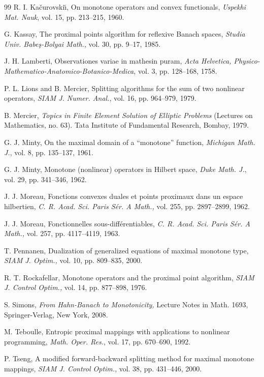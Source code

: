 \documentclass[a4paper,11pt,fleqn]{article}
\theoremstyle{plain}{\theorembodyfont{\rmfamily}%
\newtheorem{conjecture}[theorem]{Conjecture}}
\theoremstyle{plain}{\theorembodyfont{\rmfamily}%
\newtheorem{example}[theorem]{Example}}
\theoremstyle{plain}{\theorembodyfont{\rmfamily}%
\newtheorem{remark}[theorem]{Remark}}
\theoremstyle{plain}{\theorembodyfont{\rmfamily}%
\newtheorem{algorithm}[theorem]{Algorithm}}
\theoremstyle{plain}{\theorembodyfont{\rmfamily}%
\newtheorem{condition}[theorem]{Condition}}
\theoremstyle{plain}{\theorembodyfont{\rmfamily}%
\newtheorem{definition}[theorem]{Definition}}
\theoremstyle{plain}{\theorembodyfont{\rmfamily}
\newtheorem{problem}[theorem]{Problem}}
\theoremstyle{plain}{\theorembodyfont{\rmfamily}
\newtheorem{notation}[theorem]{Notation}}
\numberwithin{equation}{section}
\begin{document}
\begin{thebibliography}{99}
R. I. Ka{\v{c}}urovski{\u\i}, 
On monotone operators and convex functionals, 
{\em Uspekhi Mat. Nauk}, 
vol. 15, pp. 213--215, 1960.

G. Kassay,
The proximal points algorithm for reflexive Banach spaces,
{\em Studia Univ. Babe\c s-Bolyai Math.},
vol. 30, pp. 9--17, 1985.

J. H. Lamberti, 
Observationes variae in mathesin puram, 
{\em Acta Helvetica, 
Physico-Mathematico-Anatomico-Botanico-Medica,}
vol. 3, pp. 128--168, 1758. 

P. L. Lions and B. Mercier, 
Splitting algorithms for the sum of two nonlinear operators,
{\em SIAM J. Numer. Anal.},
vol. 16, pp. 964--979, 1979.

B. Mercier, 
{\em Topics in Finite Element Solution of Elliptic Problems}
(Lectures on Mathematics, no. 63).
Tata Institute of Fundamental Research, Bombay, 1979.

G. J. Minty, 
On the maximal domain of a ``monotone'' function,
{\em Michigan Math. J.}, 
vol. 8, pp. 135--137, 1961.

G. J. Minty, 
Monotone (nonlinear) operators in {H}ilbert space, 
{\em Duke Math. J.}, 
vol. 29, pp. 341--346, 1962.

J. J. Moreau, Fonctions convexes duales et points 
proximaux dans un espace hilbertien,
{\em C. R. Acad. Sci. Paris S\'er. A Math.,}
vol. 255, pp. 2897--2899, 1962.

J. J. Moreau, Fonctionnelles sous-diff\'erentiables,
{\em C. R. Acad. Sci. Paris S\'er. A Math.,}
vol. 257, pp. 4117--4119, 1963.

T. Pennanen, 
Dualization of generalized equations of maximal monotone type,
{\em SIAM J. Optim.,}
vol. 10, pp. 809--835, 2000.

R. T. Rockafellar, Monotone operators and the
proximal point algorithm,
{\em SIAM J. Control Optim.,}
vol. 14, pp. 877--898, 1976.

S. Simons, 
{\em From Hahn-Banach to Monotonicity,}
Lecture Notes in Math. 1693,
Springer-Verlag, New York, 2008.

M. Teboulle, 
Entropic proximal mappings with applications to nonlinear 
programming,
{\em Math. Oper. Res.}, 
vol. 17, pp. 670--690, 1992.

P. Tseng, 
A modified forward-backward splitting method for maximal monotone 
mappings, 
{\em SIAM J. Control Optim.}, 
vol. 38, pp. 431--446, 2000.


\end{thebibliography}
\end{document}
